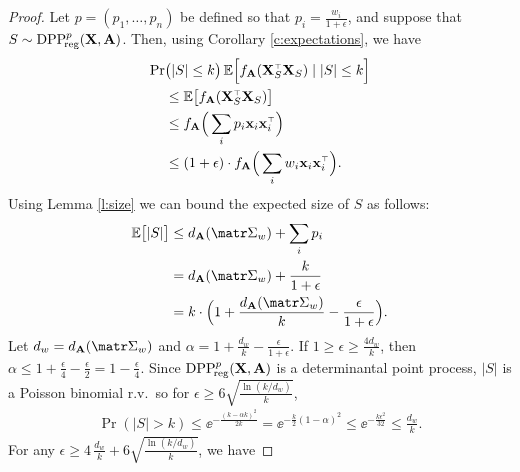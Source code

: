 \documentclass[../../thesis.tex]{subfiles}
\begin{document}
\begin{proof}
  Let $p=(p_1,\dots,p_n)$ be defined so that $p_i =
    \frac{w_i}{1+\epsilon}$, and suppose that $S\sim
    {{\mathrm{DPP}}_{\!\mathrm{reg}}^{p}}(\mathbf X,\mathbf A)$. Then, using Corollary \ref{c:expectations}, we have
  \begin{align*}
    \Pr & \big(|S|\leq k\big)\,\E\Big[f_{\A}(\X_S^\top\X_S)\mid |S|\leq k\Big] \\
        & \leq
    \E\big[f_{\A}(\X_S^\top\X_S)\big]                                          \\
        & \leq
    f_{\A}\Big(\sum_ip_i\x_i\x_i^\top\Big)
    \\ &\leq (1+\epsilon)\cdot f_{\A}\Big(\sum_iw_i\x_i\x_i^\top\Big).
  \end{align*}
  Using Lemma \ref{l:size} we can bound the expected size of $S$ as
  follows:
  \begin{align*}
    \E\big[|S|\big]
     & \leq d_{\A}(\Sigmab_w) + \sum_i p_i                                            \\
     & =d_{\A}(\Sigmab_w)+\frac{k}{1+\epsilon}                                        \\
     & =k\cdot \Big(1+\frac {d_{\A}(\Sigmab_w) }k - \frac{\epsilon}{1+\epsilon}\Big).
  \end{align*}
  Let $d_w = d_{\A}(\Sigmab_w)$ and $\alpha=1+\frac {d_w} k -\frac{\epsilon}{1+\epsilon}$.
  If $1\geq\epsilon\geq \frac{4d_w}{k}$, then $\alpha\leq 1 +
    \frac\epsilon4-\frac\epsilon2=1-\frac\epsilon4$. Since ${{\mathrm{DPP}}_{\!\mathrm{reg}}^{p}}(\mathbf X,\mathbf A)$
  is a  determinantal point process, $|S|$ is a
  Poisson binomial r.v.~so for $\epsilon\geq 6\sqrt{\frac{\ln(k/d_w)}{k}}$,
  \begin{align*}
    \Pr(|S|>k) \leq \ee^{-\frac{(k-\alpha k)^2}{2k}} = \ee^{-\frac
      k2(1-\alpha)^2}\leq \ee^{-\frac{k\epsilon^2}{32}}\leq \frac{d_w}k.
  \end{align*}
  For any $\epsilon\geq
    4\,\frac{d_w}k + 6\sqrt{\frac{\ln(k/d_w)}{k}}$, we have

\end{proof}
\end{document}

